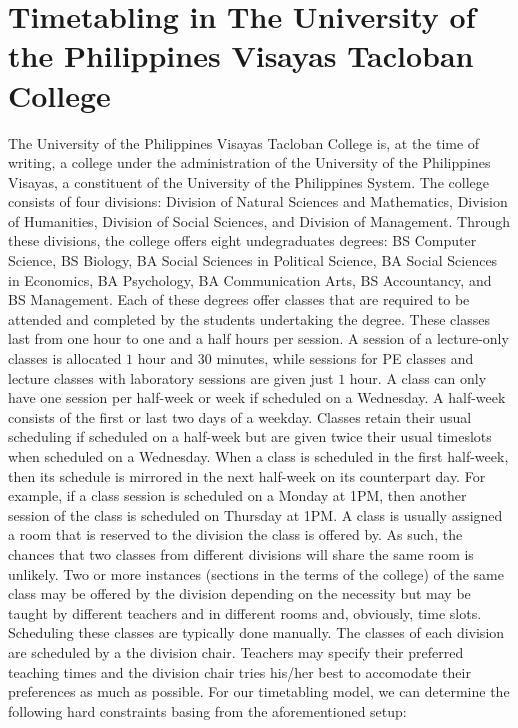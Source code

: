 \section{Timetabling in The University of the Philippines Visayas Tacloban College}
The University of the Philippines Visayas Tacloban College is, at the time of writing, a college under the administration of the University of the Philippines Visayas, a constituent of the University of the Philippines System. The college consists of four divisions: Division of Natural Sciences and Mathematics, Division of Humanities, Division of Social Sciences, and Division of Management. Through these divisions, the college offers eight undegraduates degrees: BS Computer Science, BS Biology, BA Social Sciences in Political Science, BA Social Sciences in Economics, BA Psychology, BA Communication Arts, BS Accountancy, and BS Management. Each of these degrees offer classes that are required to be attended and completed by the students undertaking the degree. These classes last from one hour to one and a half hours per session. A session of a lecture-only classes is allocated $1$ hour and $30$ minutes, while sessions for PE classes and lecture classes with laboratory sessions are given just $1$ hour. A class can only have one session per half-week or week if scheduled on a Wednesday. A half-week consists of the first or last two days of a weekday. Classes retain their usual scheduling if scheduled on a half-week but are given twice their usual timeslots when scheduled on a Wednesday. When a class is scheduled in the first half-week, then its schedule is mirrored in the next half-week on its counterpart day. For example, if a class session is scheduled on a Monday at 1PM, then another session of the class is scheduled on Thursday at 1PM. A class is usually assigned a room that is reserved to the division the class is offered by. As such, the chances that two classes from different divisions will share the same room is unlikely. Two or more instances (sections in the terms of the college) of the same class may be offered by the division depending on the necessity but may be taught by different teachers and in different rooms and, obviously, time slots. Scheduling these classes are typically done manually. The classes of each division are scheduled by a the division chair. Teachers may specify their preferred teaching times and the division chair tries his/her best to accomodate their preferences as much as possible.
For our timetabling model, we can determine the following hard constraints basing from the aforementioned setup:


